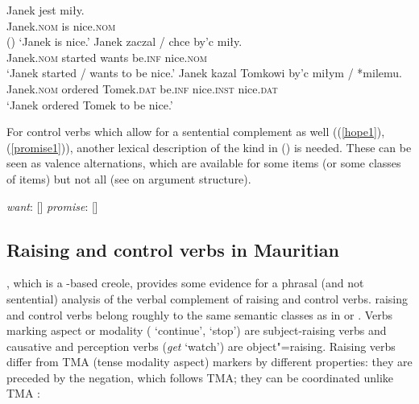 \begin{exe}
\ex \begin{xlist}
\ex 
\gll Janek jest miły.\\
     Janek.\textsc{nom} is nice.\textsc{nom} \\ \hfill()
\glt `Janek is nice.'
\ex 
\gll Janek              zaczal  /  chce  by'c            miły.\\
     Janek.\textsc{nom} started {} wants be.\textsc{inf} nice.\textsc{nom} \\ 
\glt `Janek started / wants to be nice.'
\ex 
\gll Janek              kazal   Tomkowi            by'c            miłym              / *milemu.\\
     Janek.\textsc{nom} ordered Tomek.\textsc{dat} be.\textsc{inf} nice.\textsc{inst} {} \hphantom{*}nice.\textsc{dat} \\ 
\glt `Janek ordered Tomek to be nice.'
	\end{xlist}
\end{exe}


For control verbs which allow for a sentential complement as well ((\ref{hope1}), (\ref{promise1})),
another lexical description of the kind in () is needed. These can be seen as valence alternations, which are
available for some items (or some classes of items) but not all (see  on argument structure).

\eal
\ex \emph{want}: [\argst {}]
\ex \emph{promise}: [\argst {}]
\zl




\subsection{Raising and control verbs in Mauritian}\label{sec-maurit}

%
, which is a -based creole, provides some evidence for a phrasal (and not sentential) analysis of the verbal complement of raising and control verbs.
 raising and control verbs belong
roughly to the same semantic classes as in  or . Verbs marking aspect or
modality ( `continue',  `stop') are subject-raising verbs and causative and
perception verbs (\emph{get} `watch') are object"=raising. Raising verbs differ from TMA (tense
modality aspect) markers by different properties: they are preceded by the negation, which follows
TMA; they can be coordinated unlike TMA \citep[]{HenriandLaurens2011}:

